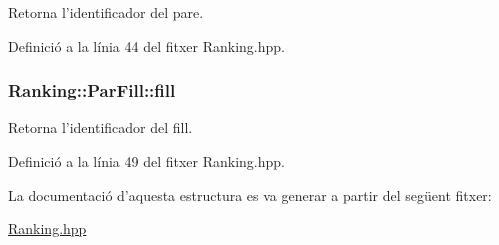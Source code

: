 Retorna l'identificador del pare. 



Definició a la línia 44 del fitxer Ranking.\-hpp.

\hypertarget{struct_ranking_1_1_par_fill_a3b20e448cd957e593268c84368529b05}{
\subsubsection[{fill}]{\setlength{\rightskip}{0pt plus 5cm}Ranking\-::\-Par\-Fill\-::fill}}\label{struct_ranking_1_1_par_fill_a3b20e448cd957e593268c84368529b05}


Retorna l'identificador del fill. 



Definició a la línia 49 del fitxer Ranking.\-hpp.



La documentació d'aquesta estructura es va generar a partir del següent fitxer\-:\begin{DoxyCompactItemize}
\item 
\hyperlink{_ranking_8hpp}{Ranking.\-hpp}\end{DoxyCompactItemize}
